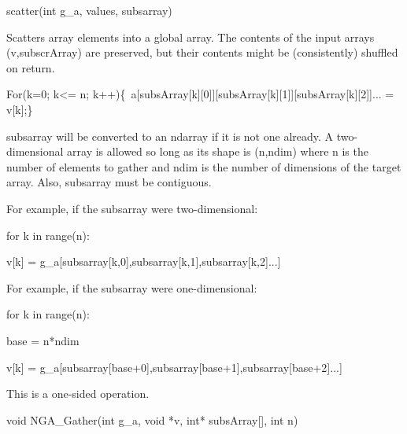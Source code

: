 \documentclass[12pt]{article}
\begin{document}
\begin{pyapi}
\begin{pycode}
scatter(int g_a, values, subsarray)  
\end{pycode}
\end{pyapi}


\begin{desc}

Scatters array elements into a global array. The contents of the input 
arrays (v,subscrArray) are preserved, but their contents might be 
(consistently) shuffled on return. 

For(k=0; k<= n; k++)\{\ a[subsArray[k][0]][subsArray[k][1]][subsArray[k][2]]... = v[k];\}\ 
 

subsarray will be converted to an ndarray if it is not one already. 
A two-dimensional array is allowed so long as its shape is (n,ndim) 
where n is the number of elements to gather and ndim is the number 
of dimensions of the target array. Also, subsarray must be contiguous.

For example, if the subsarray were two-dimensional:

for k in range(n):

    v[k] = g_a[subsarray[k,0],subsarray[k,1],subsarray[k,2]...]

For example, if the subsarray were one-dimensional:

for k in range(n):

    base = n*ndim

    v[k] = g_a[subsarray[base+0],subsarray[base+1],subsarray[base+2]...]

This is a one-sided operation.

\end{desc}


\begin{capi}
\begin{ccode}
void NGA_Gather(int g_a, void *v, int* subsArray[], int n)
\end{ccode}
\begin{funcargs}
\end{funcargs}
\end{capi}
\end{document}
